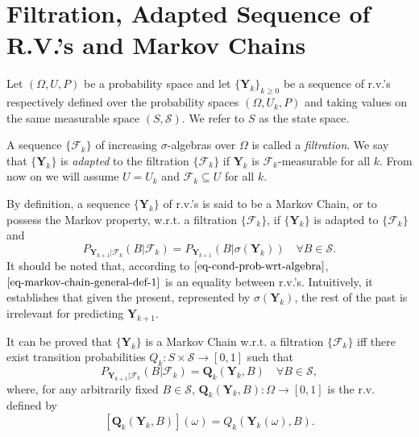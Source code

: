 \section{Filtration, Adapted Sequence of R.V.'s and Markov Chains}

Let $(\Omega,U,P)$ be a probability space and
let $\{\mathbf{Y}_k\}_{k\geqslant 0}$ be a sequence of r.v.'s
respectively defined over the probability spaces $(\Omega,U_k,P)$ and
taking values on the same measurable space $(S,\mathcal{S})$.
We refer to $S$ as the state space.

A sequence $\{\mathcal{F}_k\}$ of increasing $\sigma$-algebras over $\Omega$ is called a {\it filtration}.
We say that $\{\mathbf{Y}_k\}$ is {\it adapted} to the filtration $\{\mathcal{F}_k\}$ if $\mathbf{Y}_k$ is $\mathcal{F}_k$-measurable for all $k$.
From now on we will assume $U=U_k$ and $\mathcal{F}_k\subseteq U$ for all $k$.

By definition, a sequence $\{\mathbf{Y}_k\}$ of r.v.'s is said to be a Markov Chain, or to possess the Markov property, w.r.t. a filtration $\{\mathcal{F}_k\}$,
if $\{\mathbf{Y}_k\}$ is adapted to $\{\mathcal{F}_k\}$ and
\begin{equation}\label{eq-markov-chain-general-def-1}
P_{\mathbf{Y}_{k+1}|\mathcal{F}_k}(B|\mathcal{F}_k) = P_{\mathbf{Y}_{k+1}}(B|\sigma(\mathbf{Y}_k))\quad\forall B\in\mathcal{S}.
\end{equation}
It should be noted that, according to $\eqref{eq-cond-prob-wrt-algebra}$, $\eqref{eq-markov-chain-general-def-1}$ is an equality between r.v.'s.
Intuitively, it establishes that given the present, represented by $\sigma(\mathbf{Y}_k)$,
the rest of the past is irrelevant for predicting $\mathbf{Y}_{k+1}$.

It can be proved \cite{Du05} that $\{\mathbf{Y}_k\}$ is a Markov Chain w.r.t. a filtration $\{\mathcal{F}_k\}$ iff
there exist transition probabilities $Q_k:S\times\mathcal{S}\rightarrow [0,1]$ such that
\begin{equation}\label{eq-markov-chain-general-def-2}
P_{\mathbf{Y}_{k+1}|\mathcal{F}_k}(B|\mathcal{F}_k) = \mathbf{Q}_k(\mathbf{Y}_k,B)\quad\forall B\in\mathcal{S},
\end{equation}
where, for any arbitrarily fixed $B\in\mathcal{S}$, $\mathbf{Q}_k(\mathbf{Y}_k,B):\Omega\rightarrow [0,1]$ is the r.v. defined by
\begin{equation*}
\left[\mathbf{Q}_k(\mathbf{Y}_k,B)\right](\omega) = Q_k(\mathbf{Y}_k(\omega),B).
\end{equation*}

